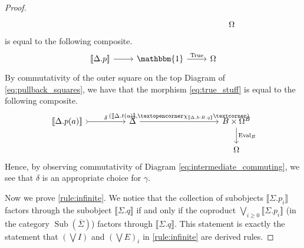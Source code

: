 \documentclass{birkjour}
\theoremstyle{plain}
\theoremstyle{definition}
\newcommand{\adj}[1]{\text{\textopencorner}{#1}\text{\textcorner}}
\begin{document}
\begin{proof}
\begin{equation}
\begin{tikzcd}[column sep = huge]
				&&&& \Omega
			\end{tikzcd}
		\end{equation}
		is equal to the following composite.
		\begin{equation}\label{eq:true_stuff}
			\begin{tikzcd}
				\llbracket \Delta. p\rrbracket\arrow[r] & \mathbbm{1}\arrow[r,"{\operatorname{True}}"] & \Omega
			\end{tikzcd}
		\end{equation}
		By commutativity of the outer square on the top Diagram of \eqref{eq:pullback_squares}, we have that the morphism \eqref{eq:true_stuff} is equal to the following composite.
		\begin{equation}
			\begin{tikzcd}[column sep = huge]
				\llbracket \Delta. p(a)\rrbracket\arrow[r,rightarrowtail,"{\delta}"] & \overline{\Delta}\arrow[rr,"{(\llbracket \Delta. t(a)\rrbracket, \adj{\chi_{\llbracket \Delta, b:B. q\rrbracket}})}"] & & B \times \Omega^B\arrow[d,"{\operatorname{Eval}_B}"]\\
				&&& \Omega
			\end{tikzcd}
		\end{equation}
		Hence, by observing commutativity of Diagram \eqref{eq:intermediate_commuting}, we see that $\delta$ is an appropriate choice for $\gamma$.
		
		Now we prove \eqref{rule:infinite}. We notice that the collection of subobjects $\llbracket \Sigma. p_i\rrbracket$ factors through the subobject $\llbracket \Sigma. q\rrbracket$ if and only if the coproduct $\bigvee_{i \geq 0}\llbracket \Sigma. p_i \rrbracket$ (in the category $\operatorname{Sub}(\overline{\Sigma})$) factors through $\llbracket \Sigma. q \rrbracket$. This statement is exactly the statement that $(\bigvee I)$ and $(\bigvee E)_i$ in \eqref{rule:infinite} are derived rules.
		

\end{proof}
\end{document}
